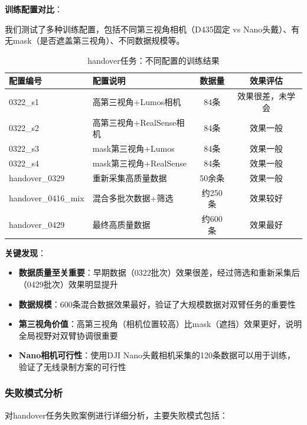 \textbf{训练配置对比}：

我们测试了多种训练配置，包括不同第三视角相机（D435固定 vs Nano头戴）、有无mask（是否遮盖第三视角）、不同数据规模等。

\begin{table}[htbp]
\centering
\caption{handover任务：不同配置的训练结果}
\label{tab:handover_results}
\begin{tabular}{llcc}
\toprule
配置编号 & 配置说明 & 数据量 & 效果评估 \\
\midrule
0322\_s1 & 高第三视角+Lumos相机 & 84条 & 效果很差，未学会 \\
0322\_s2 & 高第三视角+RealSense相机 & 84条 & 效果一般 \\
0322\_s3 & mask第三视角+Lumos & 84条 & 效果一般 \\
0322\_s4 & mask第三视角+RealSense & 84条 & 效果一般 \\
handover\_0329 & 重新采集高质量数据 & 50余条 & 效果一般 \\
handover\_0416\_mix & 混合多批次数据+筛选 & 约250条 & 效果较好 \\
handover\_0429 & 最终高质量数据 & 约600条 & 效果最好 \\
\bottomrule
\end{tabular}
\end{table}

\textbf{关键发现}：
\begin{itemize}[leftmargin=2em]
    \item \textbf{数据质量至关重要}：早期数据（0322批次）效果很差，经过筛选和重新采集后（0429批次）效果明显提升
    \item \textbf{数据规模}：600条混合数据效果最好，验证了大规模数据对双臂任务的重要性
    \item \textbf{第三视角价值}：高第三视角（相机位置较高）比mask（遮挡）效果更好，说明全局视野对双臂协调很重要
    \item \textbf{Nano相机可行性}：使用DJI Nano头戴相机采集的120条数据可以用于训练，验证了无线录制方案的可行性
\end{itemize}

\subsubsection{失败模式分析}

对handover任务失败案例进行详细分析，主要失败模式包括：

